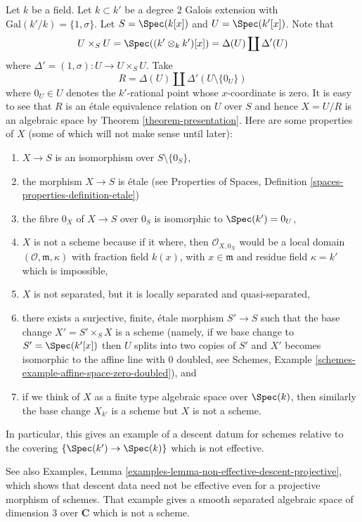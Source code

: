 \begin{example}
\label{example-non-representable-descent}
Let $k$ be a field. Let $k \subset k'$ be a degree $2$ Galois extension
with $\text{Gal}(k'/k) = \{1, \sigma\}$. Let $S = \Spec(k[x])$
and $U = \Spec(k'[x])$. Note that
$$
U \times_S U =
\Spec((k' \otimes_k k')[x]) =
\Delta(U) \coprod \Delta'(U)
$$
where $\Delta' = (1, \sigma) : U \to U \times_S U$. Take
$$
R = \Delta(U) \coprod \Delta'(U \setminus \{0_U\})
$$
where $0_U \in U$ denotes the $k'$-rational point whose $x$-coordinate is zero.
It is easy to see that $R$ is an \'etale equivalence relation on $U$ over $S$
and hence $X = U/R$ is an algebraic space by
Theorem \ref{theorem-presentation}. Here are some properties of $X$ (some
of which will not make sense until later):
\begin{enumerate}
\item $X \to S$ is an isomorphism over $S \setminus \{0_S\}$,
\item the morphism $X \to S$ is \'etale (see
Properties of Spaces,
Definition \ref{spaces-properties-definition-etale})
\item the fibre $0_X$ of $X \to S$ over $0_S$ is isomorphic to
$\Spec(k') = 0_U$,
\item $X$ is not a scheme because if it where, then $\mathcal{O}_{X, 0_X}$
would be a local domain $(\mathcal{O}, \mathfrak m, \kappa)$ with
fraction field $k(x)$, with $x \in \mathfrak m$ and residue field
$\kappa = k'$ which is impossible,
\item $X$ is not separated, but it is
locally separated and quasi-separated,
\item there exists a surjective, finite, \'etale morphism $S' \to S$
such that the base change $X' = S' \times_S X$ is a scheme (namely, if
we base change to $S' = \Spec(k'[x])$ then $U$ splits into
two copies of $S'$ and $X'$ becomes isomorphic to the affine line with
$0$ doubled, see
Schemes, Example \ref{schemes-example-affine-space-zero-doubled}), and
\item if we think of $X$ as a finite type algebraic space over
$\Spec(k)$, then similarly the base change $X_{k'}$ is a scheme
but $X$ is not a scheme.
\end{enumerate}
In particular, this gives an example of a descent datum for schemes
relative to the covering $\{\Spec(k') \to \Spec(k)\}$
which is not effective.
\end{example}

\noindent
See also Examples, 
Lemma \ref{examples-lemma-non-effective-descent-projective},
which shows that descent data need not be effective
even for a projective morphism of schemes. That example
gives a smooth separated algebraic space of dimension 3
over ${\mathbf C}$ which is not a scheme.

